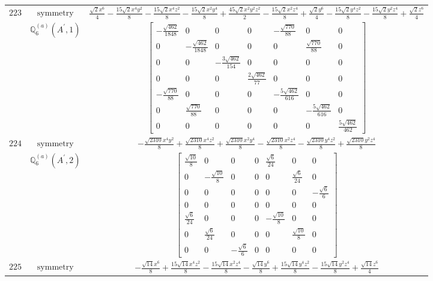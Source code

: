 \documentclass[fleqn,8pt,landscape]{jsarticle}
\begin{document}
\begin{longtable}{ccc}
$ 223 $ & $ \text{symmetry} $ & $ \frac{\sqrt{2} x^{6}}{4} - \frac{15 \sqrt{2} x^{4} y^{2}}{8} - \frac{15 \sqrt{2} x^{4} z^{2}}{8} - \frac{15 \sqrt{2} x^{2} y^{4}}{8} + \frac{45 \sqrt{2} x^{2} y^{2} z^{2}}{2} - \frac{15 \sqrt{2} x^{2} z^{4}}{8} + \frac{\sqrt{2} y^{6}}{4} - \frac{15 \sqrt{2} y^{4} z^{2}}{8} - \frac{15 \sqrt{2} y^{2} z^{4}}{8} + \frac{\sqrt{2} z^{6}}{4} $ \\
$  $ & $ \mathbb{Q}_{6}^{(a)}(A^{\prime},1) $ & $ \begin{bmatrix} - \frac{\sqrt{462}}{1848} & 0 & 0 & 0 & - \frac{\sqrt{770}}{88} & 0 & 0 \\ 0 & - \frac{\sqrt{462}}{1848} & 0 & 0 & 0 & \frac{\sqrt{770}}{88} & 0 \\ 0 & 0 & - \frac{3 \sqrt{462}}{154} & 0 & 0 & 0 & 0 \\ 0 & 0 & 0 & \frac{2 \sqrt{462}}{77} & 0 & 0 & 0 \\ - \frac{\sqrt{770}}{88} & 0 & 0 & 0 & - \frac{5 \sqrt{462}}{616} & 0 & 0 \\ 0 & \frac{\sqrt{770}}{88} & 0 & 0 & 0 & - \frac{5 \sqrt{462}}{616} & 0 \\ 0 & 0 & 0 & 0 & 0 & 0 & \frac{5 \sqrt{462}}{462} \end{bmatrix} $ \\ \hline
$ 224 $ & $ \text{symmetry} $ & $ - \frac{\sqrt{2310} x^{4} y^{2}}{8} + \frac{\sqrt{2310} x^{4} z^{2}}{8} + \frac{\sqrt{2310} x^{2} y^{4}}{8} - \frac{\sqrt{2310} x^{2} z^{4}}{8} - \frac{\sqrt{2310} y^{4} z^{2}}{8} + \frac{\sqrt{2310} y^{2} z^{4}}{8} $ \\
$  $ & $ \mathbb{Q}_{6}^{(a)}(A^{\prime},2) $ & $ \begin{bmatrix} \frac{\sqrt{10}}{8} & 0 & 0 & 0 & \frac{\sqrt{6}}{24} & 0 & 0 \\ 0 & - \frac{\sqrt{10}}{8} & 0 & 0 & 0 & \frac{\sqrt{6}}{24} & 0 \\ 0 & 0 & 0 & 0 & 0 & 0 & - \frac{\sqrt{6}}{6} \\ 0 & 0 & 0 & 0 & 0 & 0 & 0 \\ \frac{\sqrt{6}}{24} & 0 & 0 & 0 & - \frac{\sqrt{10}}{8} & 0 & 0 \\ 0 & \frac{\sqrt{6}}{24} & 0 & 0 & 0 & \frac{\sqrt{10}}{8} & 0 \\ 0 & 0 & - \frac{\sqrt{6}}{6} & 0 & 0 & 0 & 0 \end{bmatrix} $ \\ \hline
$ 225 $ & $ \text{symmetry} $ & $ - \frac{\sqrt{14} x^{6}}{8} + \frac{15 \sqrt{14} x^{4} z^{2}}{8} - \frac{15 \sqrt{14} x^{2} z^{4}}{8} - \frac{\sqrt{14} y^{6}}{8} + \frac{15 \sqrt{14} y^{4} z^{2}}{8} - \frac{15 \sqrt{14} y^{2} z^{4}}{8} + \frac{\sqrt{14} z^{6}}{4} $ \\

\end{longtable}
\end{document}
